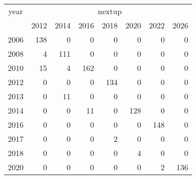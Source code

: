 \footnotesize\begin{tabular}[t]{lrrrrrrr}
\toprule
\multicolumn{1}{c}{year} & \multicolumn{7}{c}{nextup} \\
\cmidrule(l{3pt}r{3pt}){1-1} \cmidrule(l{3pt}r{3pt}){2-8}
  & 2012 & 2014 & 2016 & 2018 & 2020 & 2022 & 2026\\
\midrule
2006 & 138 & 0 & 0 & 0 & 0 & 0 & 0\\
2008 & 4 & 111 & 0 & 0 & 0 & 0 & 0\\
2010 & 15 & 4 & 162 & 0 & 0 & 0 & 0\\
2012 & 0 & 0 & 0 & 134 & 0 & 0 & 0\\
2013 & 0 & 11 & 0 & 0 & 0 & 0 & 0\\
2014 & 0 & 0 & 11 & 0 & 128 & 0 & 0\\
2016 & 0 & 0 & 0 & 0 & 0 & 148 & 0\\
2017 & 0 & 0 & 0 & 2 & 0 & 0 & 0\\
2018 & 0 & 0 & 0 & 0 & 4 & 0 & 0\\
2020 & 0 & 0 & 0 & 0 & 0 & 2 & 136\\
\bottomrule
\end{tabular}

